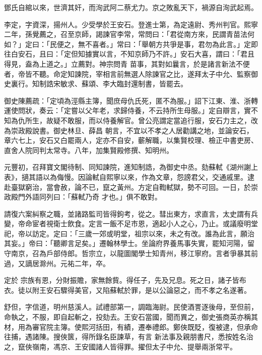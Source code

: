 \begin{pinyinscope}
 鄧氏自綰以來，世濟其奸，而洵武阿二蔡尤力。京之敗亂天下，禍源自洵武起焉。



 李定，字資深，揚州人。少受學於王安石。登進士第，為定遠尉、秀州判官。熙寧二年，孫覺薦之，召至京師，謁諫官李常，常問曰：「君從南方來，民謂青苗法何如？」定曰：「民便之，無不喜者。」常曰：「舉朝方共爭是事，君勿為此言。」定即往白安石，且曰：「定但知據實以言，不知京師乃不許。」安石大喜，謂曰：「君且得見，盍為上道之。」立薦對。神宗問青
 苗事，其對如曩言，於是諸言新法不便者，帝皆不聽。命定知諫院，宰相言前無選人除諫官之比，遂拜太子中允、監察御史裏行。知制誥宋敏求、蘇頌、李大臨封還制書，皆罷去。



 御史陳薦疏：「定頃為涇縣主簿，聞庶母仇氏死，匿不為服。」詔下江東、淮、浙轉運使問狀，奏云：「定嘗以父年老，求歸侍養，不云持所生母服。」定自辯言，實不知為仇所生，故疑不敢服，而以侍養解官。曾公亮謂定當追行服，安石力主之，改為崇政殿說書。御史林旦、薛昌
 朝言，不宜以不孝之人居勸講之地，並論安石，章六七上，安石又白罷兩人，定亦不自安，蘄解職，以集賢校理、檢正中書吏房、直舍人院同判太常寺。八年，加集賢殿修撰、知明州。



 元豐初，召拜寶文閣待制、同知諫院，進知制誥，為御史中丞。劾蘇軾《湖州謝上表》，擿其語以為侮慢。因論軾自熙寧以來，作為文章，怨謗君父，交通戚里。逮赴臺獄窮治，當會赦，論不已，竄之黃州。方定自鞫軾獄，勢不可回。一日，於崇政殿門外語同列曰：「蘇軾乃奇
 才也。」俱不敢對。



 請復六案糾察之職，並諸路監司皆得鉤考，從之。彗出東方，求直言，太史謂有兵變，帝命宦者視衛士飲食。定言一飯不足市恩，適起小人之心，乃止。或議廢明堂祀，帝以訪定。定曰：「三歲一郊或明堂，祖宗以來，未之有改。誰為此言，願治其妄。」帝曰：「聽卿言足矣。」遷翰林學士。坐論府界養馬事失實，罷知河陽，留守南京，召為戶部侍郎。哲宗立，以龍圖閣學士知青州，移江寧府。言者爭暴其前過，又謫居滁州。元祐二年，卒。



 定於
 宗族有恩，分財振贍，家無餘貲。得任子，先及兄息。死之日，諸子皆布衣。徒以附王安石驟得美官，又陷蘇軾於罪，是以公論惡之，而不孝之名遂著。



 舒但，字信道，明州慈溪人。試禮部第一，調臨海尉。民使酒詈逐後母，至但前，命執之，不服，即自起斬之，投劾去。王安石當國，聞而異之，御史張商英亦稱其材，用為審官院主簿。使熙河括田，有績，遷奉禮郎。鄭俠既貶，復被逮，但承命往捕，遇諸陳。搜俠篋，得所錄名臣諫草，有言
 新法事及親朋書尺，悉按姓名治之，竄俠嶺南，馮京、王安國諸人皆得罪。擢但太子中允、提舉兩浙常平。




\end{pinyinscope}
